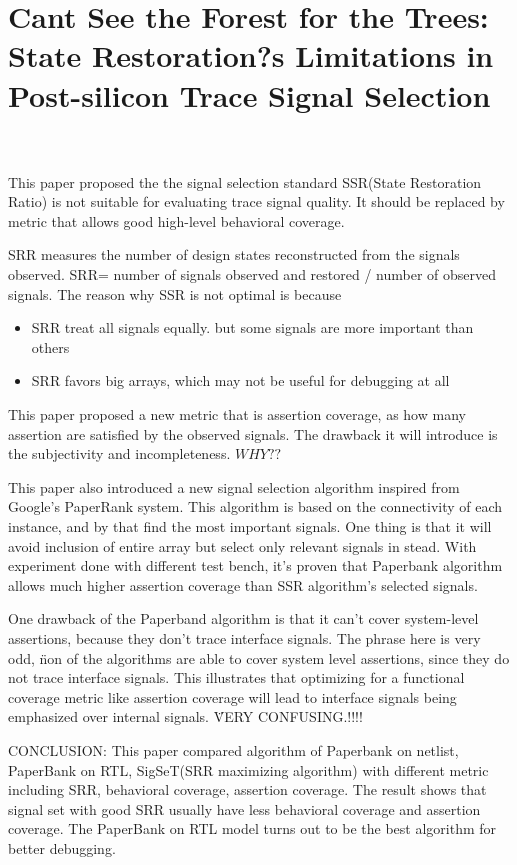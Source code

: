 \documentclass[conference]{IEEEtran}
\begin{document}
\section{Cant See the Forest for the Trees: State Restoration?s Limitations in Post-silicon Trace Signal Selection ~\cite{forestMa}}
This paper proposed the the signal selection standard SSR(State Restoration Ratio) is not suitable for evaluating trace signal quality. It should be replaced by metric that allows good high-level behavioral coverage.

SRR measures the number of design states reconstructed from the signals observed. SRR= number of signals observed and restored / number of observed signals. The reason why SSR is not optimal is because 
\begin{itemize}
\item SRR treat all signals equally. but some signals are more important than others
\item SRR favors big arrays, which may not be useful for debugging at all
\end{itemize}

This paper proposed a new metric that is assertion coverage, as how many assertion are satisfied by the observed signals. The drawback it will introduce is the subjectivity and incompleteness. \(WHY??\)

This paper also introduced a new signal selection algorithm inspired from Google's PaperRank system. This algorithm is based on the connectivity of each instance, and by that find the most important signals. One thing is that it will avoid inclusion of entire array but select only relevant signals in stead. With experiment done with different test bench, it's proven that Paperbank algorithm allows much higher assertion coverage than SSR algorithm's selected signals.

One drawback of the Paperband algorithm is that it can't cover system-level assertions, because they don't trace interface signals. The phrase here is very odd, \"non of the algorithms are able to cover system level assertions, since they do not trace interface signals. This illustrates that optimizing for a functional coverage metric like assertion coverage will lead to interface signals being emphasized over internal signals. \" 	VERY CONFUSING.!!!!

CONCLUSION: This paper compared algorithm of Paperbank on netlist, PaperBank on RTL, SigSeT(SRR maximizing algorithm) with different metric including SRR, behavioral coverage, assertion coverage. The result shows that signal set with good SRR usually have less behavioral coverage and assertion coverage. The PaperBank on RTL model turns out to be the best algorithm for better debugging. 
\end{document}
